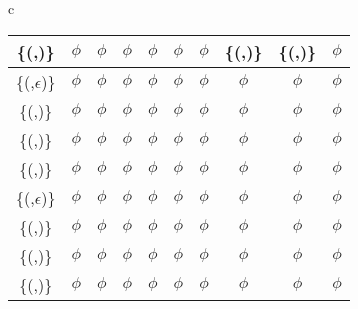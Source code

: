 \begin{figure*}
\begin{tabular}{c}
{\begin{tabular}{|c|c|c|c|c|c|c|c|c|c|}
\{(\fieldD{f}{},\fieldI{g}{}{\infty})\} & $\phi$ & $\phi$ & $\phi$ & $\phi$ & $\phi$ & $\phi$ & \{(\fieldD{f}{},\fieldI{g}{}{n})\} & \{(\fieldD{f}{},\fieldI{g}{}{\infty})\} & $\phi$\\ \hline

\{(\fieldI{f}{}{x},$\epsilon$)\} & $\phi$ & $\phi$ & $\phi$ & $\phi$ & $\phi$ & $\phi$ & $\phi$ & $\phi$ & $\phi$\\ \hline

\{(\fieldI{f}{}{x},\fieldD{g}{})\} & $\phi$ & $\phi$ & $\phi$ & $\phi$ & $\phi$ & $\phi$ & $\phi$ & $\phi$ & $\phi$\\ \hline

\{(\fieldI{f}{}{x},\fieldI{g}{}{y})\} & $\phi$ & $\phi$ & $\phi$ & $\phi$ & $\phi$ & $\phi$ & $\phi$ & $\phi$ & $\phi$\\ \hline

\{(\fieldI{f}{}{x},\fieldI{g}{}{\infty})\} & $\phi$ & $\phi$ & $\phi$ & $\phi$ & $\phi$ & $\phi$ & $\phi$ & $\phi$ & $\phi$\\ \hline

\{(\fieldI{f}{}{\infty},$\epsilon$)\} & $\phi$ & $\phi$ & $\phi$ & $\phi$ & $\phi$ & $\phi$ & $\phi$ & $\phi$ & $\phi$\\ \hline

\{(\fieldI{f}{}{\infty},\fieldD{g}{})\} & $\phi$ & $\phi$ & $\phi$ & $\phi$ & $\phi$ & $\phi$ & $\phi$ & $\phi$ & $\phi$\\ \hline

\{(\fieldI{f}{}{\infty},\fieldI{g}{}{y})\} & $\phi$ & $\phi$ & $\phi$ & $\phi$ & $\phi$ & $\phi$ & $\phi$ & $\phi$ & $\phi$\\ \hline

\{(\fieldI{f}{}{\infty},\fieldI{g}{}{\infty})\} & $\phi$ & $\phi$ & $\phi$ & $\phi$ & $\phi$ & $\phi$ & $\phi$ & $\phi$ & $\phi$\\ \hline


\end{tabular}
}

\\ \\ \\

\end{tabular}
\end{figure*}
